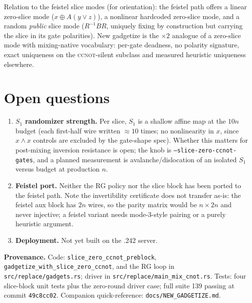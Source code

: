 \documentclass[11pt]{article}
\newcommand{\CCNOT}{\textsc{ccnot}}
\newcommand{\code}[1]{\texttt{#1}}
\newcommand{\Sone}{S_1}
\begin{document}
Relation to the feistel slice modes (for orientation): the feistel path
offers a linear zero-slice mode ($x \oplus A(y{\lor}z)$), a nonlinear
hardcoded zero-slice mode, and a random \emph{public} slice mode
($R^{-1}BR$, uniquely fixing by construction but carrying the slice in its
gate polarities). New gadgetize is the $\times 2$ analogue of a zero-slice
mode with mixing-native vocabulary: per-gate deadness, no polarity
signature, exact uniqueness on the \CCNOT{}-silent subclass and measured
heuristic uniqueness elsewhere.

\section{Open questions}

\begin{enumerate}
\item \textbf{$\Sone$ randomizer strength.} Per slice, $\Sone$ is a shallow
affine map at the $10n$ budget (each first-half wire written $\approx 10$
times; no nonlinearity in $x$, since $x{\wedge}x$ controls are excluded by
the gate-shape spec). Whether this matters for post-mixing inversion
resistance is open; the knob is \code{--slice-zero-ccnot-gates}, and a
planned measurement is avalanche/dislocation of an isolated $\Sone$ versus
budget at production $n$.
\item \textbf{Feistel port.} Neither the RG policy nor the slice block has
been ported to the feistel path. Note the invertibility certificate does
not transfer as-is: the feistel aux block has $2n$ wires, so the parity
matrix would be $n \times 2n$ and never injective; a feistel variant needs
mode-3-style pairing or a purely heuristic argument.
\item \textbf{Deployment.} Not yet built on the .242 server.
\end{enumerate}

\vspace{6pt}
\noindent\textbf{Provenance.} Code: \code{slice\_zero\_ccnot\_preblock},
\code{gadgetize\_with\_slice\_zero\_ccnot}, and the RG loop in
\code{src/replace/gadgets.rs}; driver in
\code{src/replace/main\_mix\_cnot.rs}. Tests: four slice-block unit tests
plus the zero-round driver case; full suite 139 passing at commit
\code{49c8cc02}. Companion quick-reference: \code{docs/NEW\_GADGETIZE.md}.
\end{document}
